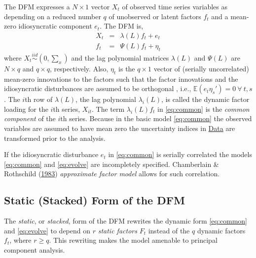 \documentclass[12pt,twoside]{reedthesis}
\begin{document}
The DFM expresses a \(N \times 1\) vector \(X_{t}\) of observed time series variables as depending on a reduced number \(q\) of unobserved or latent factors \(f_{t}\) and a mean-zero idiosyncratic component \(e_{t}\). The DFM is,
\begin{eqnarray}
  X_{t} & = & \lambda (L) f_{t} + e_{t} \label{eq:common}
  \\
  f_{t} & = & \Psi (L) f_{t} + \eta_{t} \label{eq:evolve}
\end{eqnarray}
where \(X_{t} \stackrel{iid}{\sim} (0, \sum_{x})\) and the lag polynomial matrices \(\lambda(L)\) and \(\Psi(L)\) are \(N \times q\) and \(q \times q\), respectively. Also, \(\eta_{t}\) is the \(q \times 1\) vector of (serially uncorrelated) mean-zero innovations to the factors such that the factor innovations and the idiosyncratic disturbances are assumed to be orthogonal , i.e., \(\mathbb{E}(e_{t}\eta_{s}') = 0 ~ \forall ~ t, s\). The \(i\)th row of \(\lambda(L)\), the lag polynomial \(\lambda_{i}(L)\), is called the dynamic factor loading for the \(i\)th series, \(X_{it}\). The term \(\lambda_{i}(L)f_{t}\) in \eqref{eq:common} is the \emph{common component} of the \(i\)th series. Because in the basic model \eqref{eq:common} the observed variables are assumed to have mean zero the uncertainty indices in \protect\hyperlink{data}{Data} are transformed prior to the analysis.

If the idiosyncratic disturbance \(e_{t}\) in \eqref{eq:common} is serially correlated the models \eqref{eq:common} and \eqref{eq:evolve} are incompletely specified. Chamberlain \& Rothschild (\protect\hyperlink{ref-chamroth:1983}{1983}) \emph{approximate factor model} allows for such correlation.

\hypertarget{static-stacked-form-of-the-dfm}{%
\subsection{Static (Stacked) Form of the DFM}\label{static-stacked-form-of-the-dfm}}

The \emph{static}, or \emph{stacked}, form of the DFM rewrites the dynamic form \eqref{eq:common} and \eqref{eq:evolve} to depend on \(r\) \emph{static factors} \(F_{t}\) instead of the \(q\) dynamic factors \(f_{t}\), where \(r \geq q\). This rewriting makes the model amenable to principal component analysis.
\end{document}
